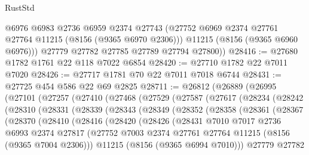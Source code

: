 \begin{lexlean}{RustStd}
\begin{coremodule}
          @6976
          @6983
          @2736
          @6959
          @2374
          @27743
          (@27752 @6969 @2374 @27761 @27764 @11215 (@8156 (@9365 @6970 @2306)))
          @11215
          (@8156 (@9365 @6960 @6976)))
        @27779
        @27782
        @27785
        @27789
        @27794
        @27800))
@28416 := @27680 @1782 @1761 @22 @118 @7022 @6854
@28420 := @27710 @1782 @22 @7011 @7020
@28426 := @27717 @1781 @70 @22 @7011 @7018 @6744
@28431 := @27725 @454 @586 @22 @69 @2825
@28711 := @26812
    (@26889
      (@26995
        (@27101
          (@27257
            (@27410
              (@27468
                (@27529
                  (@27587
                    (@27617
                      (@28234
                        (@28242
                          (@28310
                            (@28331
                              (@28339
                                (@28343
                                  (@28349
                                    (@28352
                                      (@28358
                                        (@28361
                                          (@28367
                                            (@28370
                                              (@28410
                                                (@28416
                                                  (@28420
                                                    (@28426
                                                      (@28431
                                                        @7010
                                                        @7017
                                                        @2736
                                                        @6993
                                                        @2374
                                                        @27817
                                                        (@27752
                                                          @7003
                                                          @2374
                                                          @27761
                                                          @27764
                                                          @11215
                                                          (@8156 (@9365 @7004 @2306)))
                                                        @11215
                                                        (@8156 (@9365 @6994 @7010)))
                                                      @27779
                                                      @27782

\end{coremodule}
\end{lexlean}
